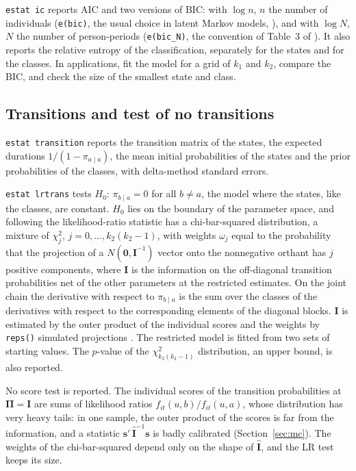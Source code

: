 \documentclass[11pt,a4paper]{article}
\newcommand{\cmd}[1]{\texttt{#1}}
\begin{document}
\cmd{estat ic} reports AIC and two versions of BIC: with $\log n$, $n$ the number of individuals
(\cmd{e(bic)}, the usual choice in latent Markov models, \citealp{bartolucci2013}), and with $\log N$,
$N$ the number of person-periods (\cmd{e(bic\_N)}, the convention of Table~3 of \citealp{carrieri2026}).
It also reports the relative entropy of the classification, separately for the states and for the
classes. In applications, fit the model for a grid of $k_1$ and $k_2$, compare the BIC, and check the
size of the smallest state and class.

\subsection{Transitions and test of no transitions}

\cmd{estat transition} reports the transition matrix of the states, the expected durations
$1/(1-\pi_{a\mid a})$, the mean initial probabilities of the states and the prior probabilities of the
classes, with delta-method standard errors.

\cmd{estat lrtrans} tests $H_0$: $\pi_{b\mid a}=0$ for all $b\ne a$, the model where the states, like the
classes, are constant. $H_0$ lies on the boundary of the parameter space, and following
\citet{bartolucci2006} the likelihood-ratio statistic has a chi-bar-squared distribution, a mixture of
$\chi^2_j$, $j=0,\dots,k_2(k_2-1)$, with weights $\omega_j$ equal to the probability that the projection
of a $N(\mathbf 0,\mathbf I^{-1})$ vector onto the nonnegative orthant has $j$ positive components, where
$\mathbf I$ is the information on the off-diagonal transition probabilities net of the other parameters
at the restricted estimates. On the joint chain the derivative with respect to $\pi_{b\mid a}$ is the sum
over the classes of the derivatives with respect to the corresponding elements of the diagonal blocks.
$\mathbf I$ is estimated by the outer product of the individual scores and the weights by \cmd{reps()}
simulated projections \citep{lawson1974}. The restricted model is fitted from two sets of starting
values. The $p$-value of the $\chi^2_{k_2(k_2-1)}$ distribution, an upper bound, is also reported.

No score test is reported. The individual scores of the transition probabilities at $\bm\Pi=\mathbf I$
are sums of likelihood ratios $f_{it}(u,b)/f_{it}(u,a)$, whose distribution has very heavy tails: in one
sample, the outer product of the scores is far from the information, and a statistic
$\mathbf s'\,\widehat{\mathbf I}^{-1}\mathbf s$ is badly calibrated (Section~\ref{sec:mc}). The weights
of the chi-bar-squared depend only on the shape of $\widehat{\mathbf I}$, and the LR test keeps its
size.
\end{document}

